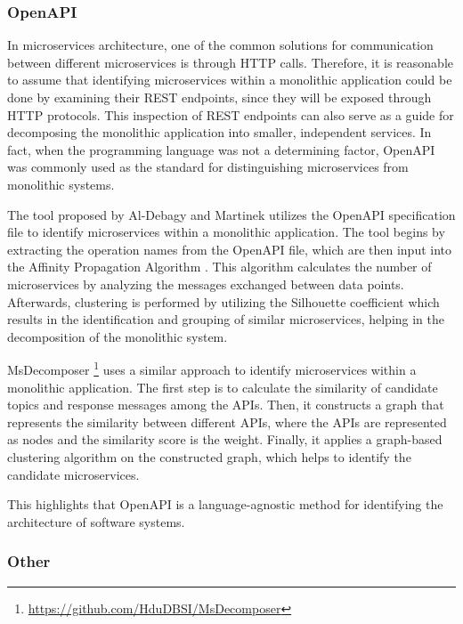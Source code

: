 \documentclass[conference]{IEEEtran}
\begin{document}
\subsubsection*{OpenAPI}

In microservices architecture, one of the common solutions for communication
between different microservices is through HTTP calls. Therefore, it is
reasonable to assume that identifying microservices within a monolithic
application could be done by examining their REST endpoints, since they will be
exposed through HTTP protocols. This inspection of REST endpoints can also
serve as a guide for decomposing the monolithic application into smaller,
independent services. In fact, when the programming language was not a
determining factor, OpenAPI was commonly used as the standard for
distinguishing microservices from monolithic systems.

The tool proposed by Al-Debagy and Martinek  utilizes the
OpenAPI specification file to identify microservices within a monolithic
application. The tool begins by extracting the operation names from the OpenAPI
file, which are then input into the Affinity Propagation Algorithm
\cite{frey2007clustering}. This algorithm calculates the number of
microservices by analyzing the messages exchanged between data points.
Afterwards, clustering is performed by utilizing the Silhouette coefficient
\cite{rousseeuw1987silhouettes} which results in the identification and
grouping of similar microservices, helping in the decomposition of the
monolithic system.

MsDecomposer \footnote{\url{https://github.com/HduDBSI/MsDecomposer}}
 uses a similar approach to identify microservices
within a monolithic application. The first step is to calculate the similarity
of candidate topics and response messages among the APIs. Then, it constructs a
graph that represents the similarity between different APIs, where the APIs are
represented as nodes and the similarity score is the weight. Finally, it
applies a graph-based clustering algorithm on the constructed graph, which
helps to identify the candidate microservices.

This highlights that OpenAPI is a language-agnostic method for identifying the
architecture of software systems.

\subsubsection*{Other}
\end{document}
